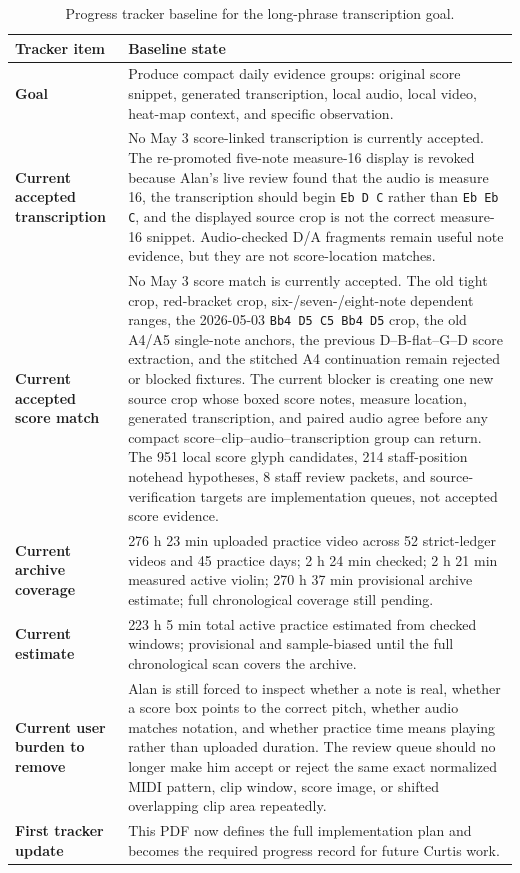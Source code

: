 \begin{table}[htbp]
\centering
\tiny
\setlength{\tabcolsep}{3pt}
\renewcommand{\arraystretch}{0.88}
\caption{Progress tracker baseline for the long-phrase transcription goal.}
\label{tab:roadmap_baseline}
\begin{tabularx}{\textwidth}{>{\bfseries}p{}X}
\toprule
Tracker item & Baseline state \\
\midrule
Goal & Produce compact daily evidence groups: original score snippet, generated transcription, local audio, local video, heat-map context, and specific observation. \\
Current accepted transcription & No May 3 score-linked transcription is currently accepted. The re-promoted five-note measure-16 display is revoked because Alan's live review found that the audio is measure 16, the transcription should begin \texttt{Eb D C} rather than \texttt{Eb Eb C}, and the displayed source crop is not the correct measure-16 snippet. Audio-checked D/A fragments remain useful note evidence, but they are not score-location matches. \\
Current accepted score match & No May 3 score match is currently accepted. The old tight crop, red-bracket crop, six-/seven-/eight-note dependent ranges, the 2026-05-03 \texttt{Bb4 D5 C5 Bb4 D5} crop, the old A4/A5 single-note anchors, the previous D--B-flat--G--D score extraction, and the stitched A4 continuation remain rejected or blocked fixtures. The current blocker is creating one new source crop whose boxed score notes, measure location, generated transcription, and paired audio agree before any compact score--clip--audio--transcription group can return. The 951 local score glyph candidates, 214 staff-position notehead hypotheses, 8 staff review packets, and source-verification targets are implementation queues, not accepted score evidence. \\
Current archive coverage & 276 h 23 min uploaded practice video across 52 strict-ledger videos and 45 practice days; 2 h 24 min checked; 2 h 21 min measured active violin; 270 h 37 min provisional archive estimate; full chronological coverage still pending. \\
Current estimate & 223 h 5 min total active practice estimated from checked windows; provisional and sample-biased until the full chronological scan covers the archive. \\
Current user burden to remove & Alan is still forced to inspect whether a note is real, whether a score box points to the correct pitch, whether audio matches notation, and whether practice time means playing rather than uploaded duration. The review queue should no longer make him accept or reject the same exact normalized MIDI pattern, clip window, score image, or shifted overlapping clip area repeatedly. \\
First tracker update & This PDF now defines the full implementation plan and becomes the required progress record for future Curtis work. \\
\bottomrule
\end{tabularx}
\end{table}

